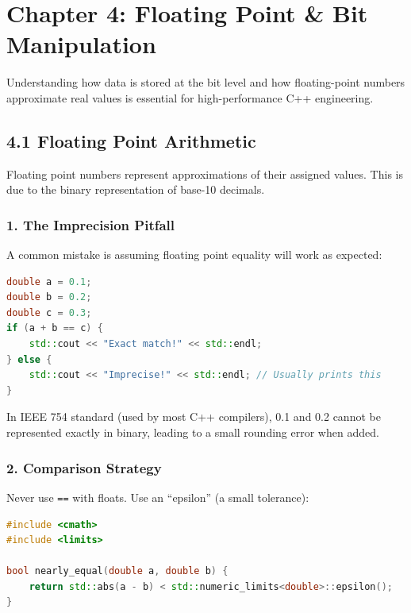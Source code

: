 \hypertarget{chapter-4-floating-point-bit-manipulation}{%
\section{Chapter 4: Floating Point \& Bit
Manipulation}\label{chapter-4-floating-point-bit-manipulation}}

Understanding how data is stored at the bit level and how floating-point
numbers approximate real values is essential for high-performance C++
engineering.

\hypertarget{floating-point-arithmetic}{%
\subsection{4.1 Floating Point
Arithmetic}\label{floating-point-arithmetic}}

Floating point numbers represent approximations of their assigned
values. This is due to the binary representation of base-10 decimals.

\hypertarget{the-imprecision-pitfall}{%
\subsubsection{1. The Imprecision
Pitfall}\label{the-imprecision-pitfall}}

A common mistake is assuming floating point equality will work as
expected:

\begin{lstlisting}[language={C++}]
double a = 0.1;
double b = 0.2;
double c = 0.3;
if (a + b == c) {
    std::cout << "Exact match!" << std::endl;
} else {
    std::cout << "Imprecise!" << std::endl; // Usually prints this
}
\end{lstlisting}

In IEEE 754 standard (used by most C++ compilers), 0.1 and 0.2 cannot be
represented exactly in binary, leading to a small rounding error when
added.

\hypertarget{comparison-strategy}{%
\subsubsection{2. Comparison Strategy}\label{comparison-strategy}}

Never use \passthrough{\lstinline!==!} with floats. Use an ``epsilon''
(a small tolerance):

\begin{lstlisting}[language={C++}]
#include <cmath>
#include <limits>

bool nearly_equal(double a, double b) {
    return std::abs(a - b) < std::numeric_limits<double>::epsilon();
}
\end{lstlisting}

